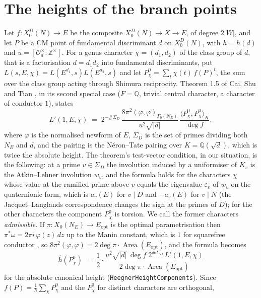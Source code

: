 \documentclass[11pt,reqno]{amsart}
\theoremstyle{plain}
\theoremstyle{definition}
\DeclareMathOperator{\Area}{Area}
\newcommand{\Q}{\mathbb{Q}}
\newcommand{\Z}{\mathbb{Z}}
\newcommand{\hh}{\hat h}
\begin{document}
\section{The heights of the branch points}\label{sec:heights}

Let $f\colon X_0^D(N)\to E$ be the composite $X_0^D(N)\to X\to E$, of degree $2|W|$, and let $P$ be
a CM point of fundamental discriminant $d$ on $X_0^D(N)$, with $h=h(d)$ and $u=[\mathcal
O_d^\times:\Z^\times]$. For a genus character $\chi=(d_1,d_2)$ of the class group of $d$, that is a
factorisation $d=d_1d_2$ into fundamental discriminants, put $L(s,E,\chi)=L(E^{d_1},s)L(E^{d_2},s)$
and let $P^0_\chi=\sum_{t}\chi(t)\,f(P)^t$, the sum over the class group acting through
Shimura reciprocity. Theorem 1.5 of Cai, Shu and Tian \cite{cst}, in its second special case
($F=\Q$, trivial central character, a character of conductor $1$), states
\[
  L'(1,E,\chi)\;=\;2^{-\#\Sigma_D}\,\frac{8\pi^2(\varphi,\varphi)_{\Gamma_0(N_E)}}{u^2\sqrt{|d|}}\,
  \frac{\langle P^0_\chi,P^0_{\bar\chi}\rangle_K}{\deg f},
\]
where $\varphi$ is the normalised newform of $E$, $\Sigma_D$ is the set of primes dividing both
$N_E$ and $d$, and the pairing is the N\'eron--Tate pairing over $K=\Q(\sqrt d)$, which is twice
the absolute height. The theorem's test-vector condition, in our situation, is the following:
at a prime $v\in\Sigma_D$ the involution induced by a uniformiser of $K_v$ is the Atkin--Lehner
involution $w_v$, and the formula holds for the characters $\chi$ whose value at the ramified
prime above $v$ equals the eigenvalue $\varepsilon_v$ of $w_v$ on the quaternionic form, which is
$a_v(E)$ for $v\mid D$ and $-a_v(E)$ for $v\mid N$ (the Jacquet--Langlands correspondence changes the
sign at the primes of $D$); for the other characters the component $P^0_\chi$ is torsion. We call
the former characters \emph{admissible}. If $\pi\colon X_0(N_E)\to E_{\mathrm{opt}}$ is the optimal
parametrisation then $\pi^*\omega=2\pi i\,\varphi(z)\,dz$ up to the Manin constant, which is $1$ for
squarefree conductor \cite{cesnavicius}, so $8\pi^2(\varphi,\varphi)=2\deg\pi\cdot\Area(E_{\mathrm
{opt}})$, and the formula becomes
\begin{equation}\label{eq:height}
  \hh(P^0_\chi)\;=\;\frac12\cdot\frac{u^2\sqrt{|d|}\,\deg f\;2^{\#\Sigma_D}\,L'(1,E,\chi)}
  {2\deg\pi\cdot\Area(E_{\mathrm{opt}})}
\end{equation}
for the absolute canonical height (\texttt{HeegnerHeightComponents}). Since $f(P)=\frac1h\sum_\chi
P^0_\chi$ and the $P^0_\chi$ for distinct characters are orthogonal,
\end{document}
